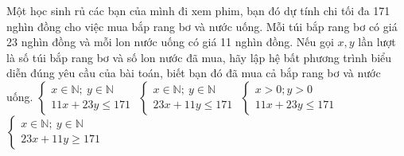 \begin{ex}
Một học sinh rủ các bạn của mình đi xem phim, bạn đó dự tính chi tối đa 171 nghìn đồng cho việc mua bắp rang bơ và nước uống. Mỗi túi bắp rang bơ có giá 23 nghìn đồng và mỗi lon nước uống có giá 11 nghìn đồng. Nếu gọi ${x,y}$ lần lượt là số túi bắp rang bơ và số lon nước đã mua, hãy lập hệ bất phương trình biểu diễn đúng yêu cầu của bài toán, biết bạn đó đã mua cả bắp rang bơ và nước uống.
\choice
{$\begin{cases}x\in\mathbb{N};\ y\in\mathbb{N}\\11x+23y\le 171\end{cases}$}
{\True $\begin{cases}x\in\mathbb{N};\ y\in\mathbb{N}\\23x+11y\le 171\end{cases}$}
{$\begin{cases}x>0; y>0 \\11x+23y\le 171\end{cases}$}
{$\begin{cases}x\in\mathbb{N};\ y\in\mathbb{N}\\23x+11y\ge 171\end{cases}$}
\end{ex}

